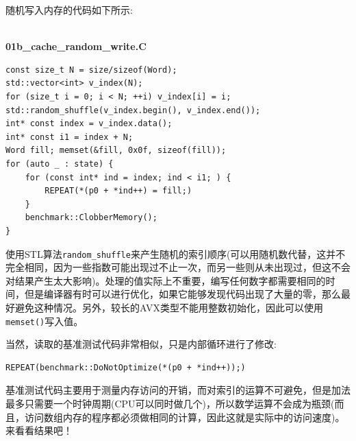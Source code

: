 随机写入内存的代码如下所示:

\hspace*{\fill} \\ %
\noindent
\textbf{01b\_cache\_random\_write.C}
\begin{lstlisting}[style=styleCXX]
const size_t N = size/sizeof(Word);
std::vector<int> v_index(N);
for (size_t i = 0; i < N; ++i) v_index[i] = i;
std::random_shuffle(v_index.begin(), v_index.end());
int* const index = v_index.data();
int* const i1 = index + N;
Word fill; memset(&fill, 0x0f, sizeof(fill));
for (auto _ : state) {
	for (const int* ind = index; ind < i1; ) {
		REPEAT(*(p0 + *ind++) = fill;)
	}
	benchmark::ClobberMemory();
}
\end{lstlisting}

使用STL算法\texttt{random\_shuffle}来产生随机的索引顺序(可以用随机数代替，这并不完全相同，因为一些指数可能出现过不止一次，而另一些则从未出现过，但这不会对结果产生太大影响)。处理的值实际上不重要，编写任何数字都需要相同的时间，但是编译器有时可以进行优化，如果它能够发现代码出现了大量的零，那么最好避免这种情况。另外，较长的AVX类型不能用整数初始化，因此可以使用\texttt{memset()}写入值。

当然，读取的基准测试代码非常相似，只是内部循环进行了修改:

\begin{lstlisting}[style=styleCXX]
REPEAT(benchmark::DoNotOptimize(*(p0 + *ind++));)
\end{lstlisting}

基准测试代码主要用于测量内存访问的开销，而对索引的运算不可避免，但是加法最多只需要一个时钟周期(CPU可以同时做几个)，所以数学运算不会成为瓶颈(而且，访问数组内存的程序都必须做相同的计算，因此这就是实际中的访问速度)。来看看结果吧！




























